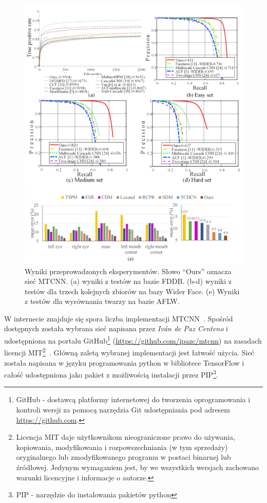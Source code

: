 \begin{figure}[P]
    \centering
    \includegraphics[width=1\textwidth]{images/mtcnn-wyniki}
    \caption{
        Wyniki przeprowadzonych eksperymentów. Słowo ``Ours'' oznacza sieć MTCNN.
        (a) wyniki z testów na bazie FDDB.
        (b-d) wyniki z testów dla trzech kolejnych zbiorów na bazy Wider Face.
        (e) Wyniki z testów dla wyrównania twarzy na bazie AFLW.
    }
    \label{fig:mtcnn_wyniki}
\end{figure}


W internecie znajduje się spora liczba implementacji MTCNN~\cite{mtznn_all_impls}.
Spośród dostępnych została wybrana sieć napisana przez \textit{Iván de Paz Centeno}
i udostępniona na portalu GitHub\footnote{GitHub - dostawcą platformy internetowej do tworzenia
oprogramowania i kontroli wersji za pomocą narzędzia Git udostępniania
pod adresem \url{https://github.com}. } (\url{https://github.com/ipazc/mtcnn}) na zasadach licencji MIT\footnote{Licencja MIT daje użytkownikom
nieograniczone prawo do używania, kopiowania, modyfikowania i rozpowszechniania (w tym sprzedaży)
    oryginalnego lub zmodyfikowanego programu w postaci binarnej lub źródłowej.
    Jedynym wymaganiem jest, by we wszystkich wersjach zachowano warunki licencyjne i informacje o autorze.
}~\cite{ipazc/mtcnn}.
Główną zaletą wybranej implementacji jest łatwość użycia.
Sieć została napisana w języku programowania python w bibliotece TensorFlow
i całość udostępniona jako pakiet z możliwością instalacji
przez PIP\footnote{PIP - narzędzie do instalowania pakietów python}.


